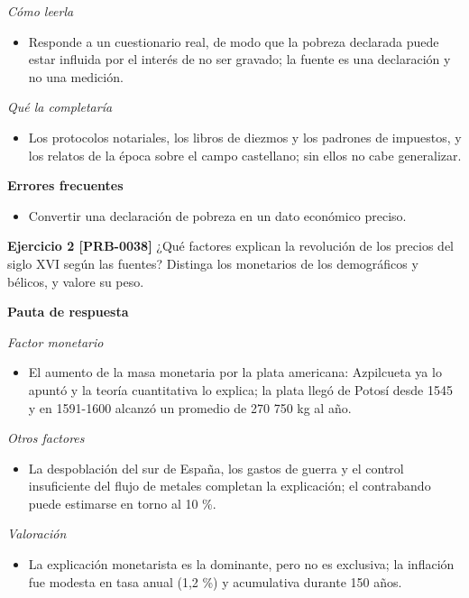 \documentclass{book}
\begin{document}
\noindent\textit{Cómo leerla}
\begin{itemize}
\item Responde a un cuestionario real, de modo que la pobreza declarada puede estar influida por el interés de no ser gravado; la fuente es una declaración y no una medición.
\end{itemize}

\noindent\textit{Qué la completaría}
\begin{itemize}
\item Los protocolos notariales, los libros de diezmos y los padrones de impuestos, y los relatos de la época sobre el campo castellano; sin ellos no cabe generalizar.
\end{itemize}

\noindent\textbf{Errores frecuentes}
\begin{itemize}
\item Convertir una declaración de pobreza en un dato económico preciso.
\end{itemize}

\noindent\textbf{Ejercicio 2 [PRB-0038]}
¿Qué factores explican la revolución de los precios del siglo XVI según las fuentes? Distinga los monetarios de los demográficos y bélicos, y valore su peso.


\noindent\textbf{Pauta de respuesta}

\noindent\textit{Factor monetario}
\begin{itemize}
\item El aumento de la masa monetaria por la plata americana: Azpilcueta ya lo apuntó y la teoría cuantitativa lo explica; la plata llegó de Potosí desde 1545 y en 1591-1600 alcanzó un promedio de 270 750 kg al año.
\end{itemize}

\noindent\textit{Otros factores}
\begin{itemize}
\item La despoblación del sur de España, los gastos de guerra y el control insuficiente del flujo de metales completan la explicación; el contrabando puede estimarse en torno al 10 \%.
\end{itemize}

\noindent\textit{Valoración}
\begin{itemize}
\item La explicación monetarista es la dominante, pero no es exclusiva; la inflación fue modesta en tasa anual (1,2 \%) y acumulativa durante 150 años.
\end{itemize}
\end{document}
